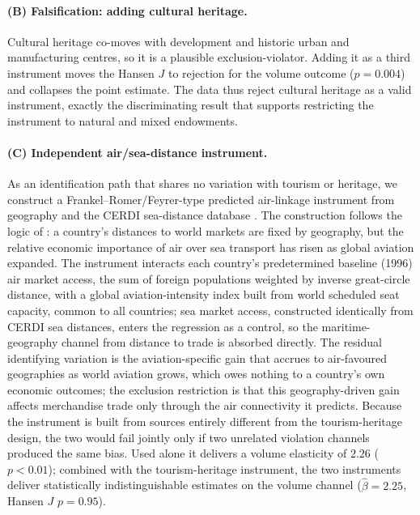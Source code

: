 \paragraph{(B) Falsification: adding cultural heritage.} Cultural heritage
co-moves with development and historic urban and manufacturing centres, so it
is a plausible exclusion-violator. Adding it as a third instrument moves the
Hansen $J$ to rejection for the volume outcome ($p=0.004$) and collapses the
point estimate. The data thus reject cultural heritage as a valid
instrument, exactly the discriminating result that supports restricting the
instrument to natural and mixed endowments.

\paragraph{(C) Independent air/sea-distance instrument.} As an identification
path that shares no variation with tourism or heritage, we construct a
Frankel--Romer/Feyrer-type predicted air-linkage instrument from geography and
the CERDI sea-distance database
\citep{Frankel_1999,Feyrer_2019,Bertoli_2016}. The construction follows the
logic of \citet{Feyrer_2019}: a country's distances to world markets are
fixed by geography, but the relative economic importance of air over sea
transport has risen as global aviation expanded. The instrument interacts
each country's predetermined baseline (1996) air market access, the sum of
foreign populations weighted by inverse great-circle distance, with a global
aviation-intensity index built from world scheduled seat capacity, common to
all countries; sea market access, constructed identically from CERDI
sea distances, enters the regression as a control, so the maritime-geography
channel from distance to trade is absorbed directly. The residual
identifying variation is the aviation-specific gain that accrues to
air-favoured geographies as world aviation grows, which owes nothing to a
country's own economic outcomes; the exclusion restriction is that this
geography-driven gain affects merchandise trade only through the air
connectivity it predicts. Because the instrument is built from
sources entirely different from the tourism-heritage design, the two would
fail jointly only if two unrelated violation channels produced the same bias.
Used alone it delivers a volume
elasticity of $2.26$ ($p<0.01$); combined with the tourism-heritage instrument,
the two instruments deliver statistically indistinguishable estimates on the
volume channel ($\hat\beta=2.25$, Hansen $J$ $p=0.95$).

